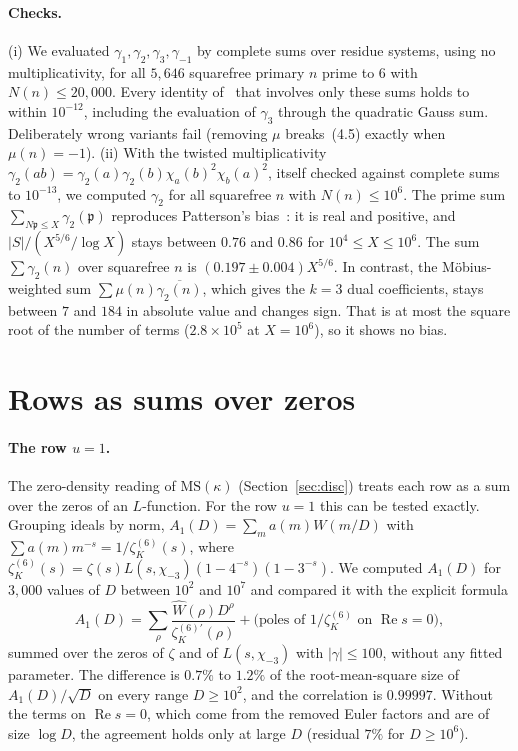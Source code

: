 \documentclass[11pt]{article}
\theoremstyle{remark}
\begin{document}
\paragraph{Checks.} (i) We evaluated $\gamma_1,\gamma_2,\gamma_3,\gamma_{-1}$ by complete
sums over residue systems, using no multiplicativity, for all $5{,}646$ squarefree primary
$n$ prime to $6$ with $N(n)\le20{,}000$. Every identity of~\cite[Lemma~4.1]{OAI} that
involves only these sums holds to within $10^{-12}$, including the evaluation of
$\gamma_3$ through the quadratic Gauss sum. Deliberately wrong variants fail (removing
$\mu$ breaks~(4.5) exactly when $\mu(n)=-1$). (ii) With the twisted multiplicativity
$\gamma_2(ab)=\gamma_2(a)\gamma_2(b)\chi_a(b)^2\chi_b(a)^2$, itself checked against complete
sums to $10^{-13}$, we computed $\gamma_2$ for all squarefree $n$ with $N(n)\le10^6$. The
prime sum $\sum_{N\mathfrak p\le X}\gamma_2(\mathfrak p)$ reproduces Patterson's
bias~\cite{HB00,DR}: it is real and positive, and $|S|/(X^{5/6}/\log X)$ stays between
$0.76$ and $0.86$ for $10^4\le X\le10^6$. The sum $\sum\gamma_2(n)$ over squarefree $n$ is
$(0.197\pm0.004)X^{5/6}$. In contrast, the Möbius-weighted sum
$\sum\mu(n)\overline{\gamma_2(n)}$, which gives the $k=3$ dual coefficients, stays between
$7$ and $184$ in absolute value and changes sign. That is at most the square root of the
number of terms ($2.8\times10^5$ at $X=10^6$), so it shows no bias.

\section{Rows as sums over zeros}\label{sec:rows}

\paragraph{The row $u=1$.} The zero-density reading of $\mathrm{MS}(\kappa)$ (Section~\ref{sec:disc}) treats
each row as a sum over the zeros of an $L$-function. For the row $u=1$ this can be tested
exactly. Grouping ideals by norm, $A_1(D)=\sum_m a(m)W(m/D)$ with
$\sum a(m)m^{-s}=1/\zeta_K^{(6)}(s)$, where $\zeta_K^{(6)}(s)=\zeta(s)L(s,\chi_{-3})
(1-4^{-s})(1-3^{-s})$. We computed $A_1(D)$ for $3{,}000$ values of $D$ between $10^2$ and
$10^7$ and compared it with the explicit formula
\[
A_1(D)=\sum_{\rho}\frac{\widehat W(\rho)D^{\rho}}{\zeta_K^{(6)\prime}(\rho)}
+\big(\text{poles of }1/\zeta_K^{(6)}\text{ on }\operatorname{Re}s=0\big),
\]
summed over the zeros of $\zeta$ and of $L(s,\chi_{-3})$ with $|\gamma|\le100$, without any
fitted parameter. The difference is $0.7\%$ to $1.2\%$ of the root-mean-square size of
$A_1(D)/\sqrt D$ on every range $D\ge10^2$, and the correlation is $0.99997$. Without the
terms on $\operatorname{Re}s=0$, which come from the removed Euler factors and are of size
$\log D$, the agreement holds only at large $D$ (residual $7\%$ for $D\ge10^6$).
\end{document}
